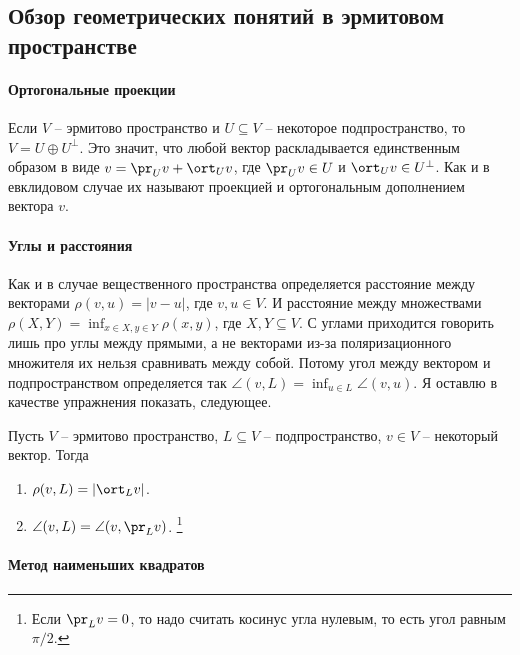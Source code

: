 \subsection{Обзор геометрических понятий в эрмитовом пространстве}

\paragraph{Ортогональные проекции}

Если $V$ -- эрмитово пространство и $U\subseteq V$ -- некоторое подпространство, то $V = U\oplus U^\bot$.
Это значит, что любой вектор раскладывается единственным образом в виде $v = \pr_U v + \ort_U v$, где $\pr_U v\in U$ и $\ort_U v \in U^\bot$.
Как и в евклидовом случае их называют проекцией и ортогональным дополнением вектора $v$.

\paragraph{Углы и расстояния}

Как и в случае вещественного пространства определяется расстояние между векторами $\rho(v,u) = |v - u|$, где $v,u\in V$.
И расстояние между множествами $\rho(X, Y) = \inf_{x\in X, y\in Y}\rho(x,y)$, где $X,Y\subseteq V$.
С углами приходится говорить лишь про углы между прямыми, а не векторами из-за поляризационного множителя их нельзя сравнивать между собой.
Потому угол между вектором и подпространством определяется так $\angle(v,L) = \inf_{u\in L}\angle(v,u)$.
Я оставлю в качестве упражнения показать, следующее.

\begin{claim}
\label{claim::DistAngleHerm}
Пусть $V$ -- эрмитово пространство, $L\subseteq V$ -- подпространство, $v\in V$ -- некоторый вектор.
Тогда
\begin{enumerate}
\item $\rho(v, L) = |\ort_L v|$.

\item $\angle(v, L) = \angle(v, \pr_L v)$.%
\footnote{Если $\pr_L v = 0$, то надо считать косинус угла нулевым, то есть угол равным $\pi/2$.}
\end{enumerate}
\end{claim}


\paragraph{Метод наименьших квадратов}

